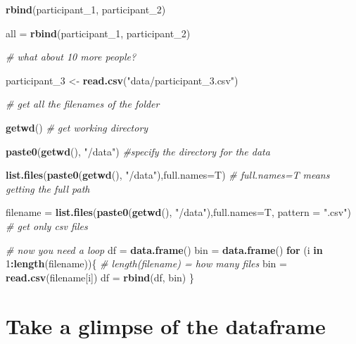 \documentclass[]{book}
\newenvironment{Shaded}{\begin{snugshade}}{\end{snugshade}}
\newcommand{\KeywordTok}[1]{\textcolor[rgb]{0.13,0.29,0.53}{\textbf{#1}}}
\newcommand{\DataTypeTok}[1]{\textcolor[rgb]{0.13,0.29,0.53}{#1}}
\newcommand{\DecValTok}[1]{\textcolor[rgb]{0.00,0.00,0.81}{#1}}
\newcommand{\StringTok}[1]{\textcolor[rgb]{0.31,0.60,0.02}{#1}}
\newcommand{\CommentTok}[1]{\textcolor[rgb]{0.56,0.35,0.01}{\textit{#1}}}
\newcommand{\ControlFlowTok}[1]{\textcolor[rgb]{0.13,0.29,0.53}{\textbf{#1}}}
\newcommand{\OperatorTok}[1]{\textcolor[rgb]{0.81,0.36,0.00}{\textbf{#1}}}
\newcommand{\NormalTok}[1]{#1}
\begin{document}
\begin{Shaded}
\begin{Highlighting}[]
\KeywordTok{rbind}\NormalTok{(participant_}\DecValTok{1}\NormalTok{, participant_}\DecValTok{2}\NormalTok{)}

\NormalTok{all =}\StringTok{ }\KeywordTok{rbind}\NormalTok{(participant_}\DecValTok{1}\NormalTok{, participant_}\DecValTok{2}\NormalTok{)}

\CommentTok{# what about 10 more people?}

\NormalTok{participant_}\DecValTok{3}\NormalTok{ <-}\StringTok{ }\KeywordTok{read.csv}\NormalTok{(}\StringTok{"data/participant_3.csv"}\NormalTok{)}

\CommentTok{# get all the filenames of the folder}

\KeywordTok{getwd}\NormalTok{() }\CommentTok{# get working directory}

\KeywordTok{paste0}\NormalTok{(}\KeywordTok{getwd}\NormalTok{(), }\StringTok{"/data"}\NormalTok{) }\CommentTok{#specify the directory for the data}

\KeywordTok{list.files}\NormalTok{(}\KeywordTok{paste0}\NormalTok{(}\KeywordTok{getwd}\NormalTok{(), }\StringTok{"/data"}\NormalTok{),}\DataTypeTok{full.names=}\NormalTok{T) }\CommentTok{# full.names=T means getting the full path}

\NormalTok{filename =}\StringTok{ }\KeywordTok{list.files}\NormalTok{(}\KeywordTok{paste0}\NormalTok{(}\KeywordTok{getwd}\NormalTok{(), }\StringTok{"/data"}\NormalTok{),}\DataTypeTok{full.names=}\NormalTok{T, }\DataTypeTok{pattern =} \StringTok{".csv"}\NormalTok{) }\CommentTok{# get only csv files}

\CommentTok{# now you need a loop}
\NormalTok{df =}\StringTok{ }\KeywordTok{data.frame}\NormalTok{()}
\NormalTok{bin =}\StringTok{ }\KeywordTok{data.frame}\NormalTok{()}
\ControlFlowTok{for}\NormalTok{ (i }\ControlFlowTok{in} \DecValTok{1}\OperatorTok{:}\KeywordTok{length}\NormalTok{(filename))\{}
  \CommentTok{# length(filename) = how many files}
\NormalTok{  bin =}\StringTok{ }\KeywordTok{read.csv}\NormalTok{(filename[i])}
\NormalTok{  df =}\StringTok{ }\KeywordTok{rbind}\NormalTok{(df, bin)}
\NormalTok{\}}
\end{Highlighting}
\end{Shaded}

\section{Take a glimpse of the
dataframe}\label{take-a-glimpse-of-the-dataframe}
\end{document}
